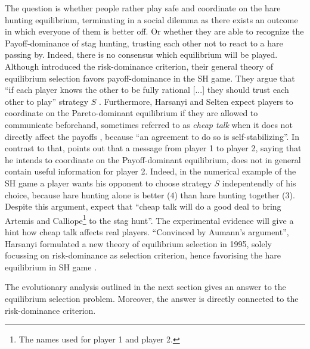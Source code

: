 The question is whether people rather play
safe and coordinate on the hare hunting equilibrium, terminating in a social
dilemma as there exists an outcome in which everyone of them is better off.
Or whether they are able to recognize the Payoff-dominance of stag hunting, 
trusting each other not to react to a hare passing by.
Indeed, there is no consensus which equilibrium will be played. 
Although \textcite{harsanyi_general_1988} introduced the 
risk-dominance criterion, their general theory of equilibrium 
selection favors payoff-dominance in the SH game. They argue that
``if each player knows the other to be fully rational [...] they should trust
each other to play'' strategy $S$ \parencite[89]{harsanyi_general_1988}.
Furthermore, Harsanyi and Selten expect players to coordinate on the
Pareto-dominant equilibrium if they are allowed to communicate beforehand,
sometimes referred to as \textit{cheap talk} when it does not directly affect
the payoffs \parencite[104]{farrell_cheap_1996}, 
because ``an agreement to do so is self-stabilizing''. 
In contrast to that,
\textcite{aumann_nash_1990} points out that a message from player 1 to 
player 2, saying that he intends to coordinate on the Payoff-dominant 
equilibrium, does not in general contain useful information for player 2. 
Indeed, in the numerical example of the SH game a player wants his
opponent to choose strategy $S$ indepentendly of his choice, because
hare hunting alone is better ($4$) than hare hunting together ($3$).
Despite this argument, 
\textcite[114]{farrell_cheap_1996} expect that 
``cheap talk will do a good deal to
bring Artemis and Calliope\footnote{The names
\textcite{farrell_cheap_1996} used for player 1 and player 2.} 
to the stag hunt''. The experimental evidence will give a hint how cheap
talk affects real players. 
``Convinced by Aumann's argument'', Harsanyi formulated a new theory
of equilibrium selection in 1995, solely focussing on 
risk-dominance as selection criterion, hence favorising the hare 
equilibrium in SH game \parencite[92,94,96]{harsanyi_new_1995}. 

The evolutionary analysis outlined in the next section gives an answer
to the equilibrium selection problem. Moreover, the answer is directly
connected to the risk-dominance criterion.
